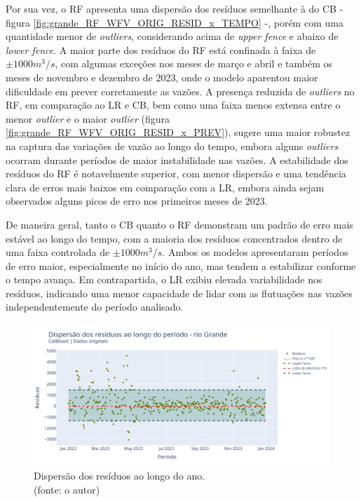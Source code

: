 Por sua vez, o RF apresenta uma dispersão dos resíduos semelhante à do CB - figura \ref{fig:grande_RF_WFV_ORIG_RESID_x_TEMPO} -, porém com uma quantidade menor de \textit{outliers}, considerando acima de \textit{upper fence} e abaixo de \textit{lower fence}. A maior parte dos resíduos do RF está confinada à faixa de $\pm 1000 m^3/s$, com algumas exceções nos meses de março e abril e também os meses de novembro e dezembro de 2023, onde o modelo aparentou maior dificuldade em prever corretamente as vazões. A presença reduzida de \textit{outliers} no RF, em comparação ao LR e CB, bem como uma faixa menos extensa entre o menor \textit{outlier} e o maior \textit{outlier} (figura \ref{fig:grande_RF_WFV_ORIG_RESID_x_PREV}), sugere uma maior robustez na captura das variações de vazão ao longo do tempo, embora alguns \textit{outliers} ocorram durante períodos de maior instabilidade nas vazões. A estabilidade dos resíduos do RF é notavelmente superior, com menor dispersão e uma tendência clara de erros mais baixos em comparação com a LR, embora ainda sejam observados alguns picos de erro nos primeiros meses de 2023.

De maneira geral, tanto o CB quanto o RF demonstram um padrão de erro mais estável ao longo do tempo, com a maioria dos resíduos concentrados dentro de uma faixa controlada de $\pm 1000 m^3/s$. Ambos os modelos apresentaram períodos de erro maior, especialmente no início do ano, mas tendem a estabilizar conforme o tempo avança. Em contrapartida, o LR exibiu elevada variabilidade nos resíduos, indicando uma menor capacidade de lidar com as flutuações nas vazões independentemente do período analisado.

\begin{figure}[!h]
	\centering
	\includegraphics[scale=0.33]{Figuras/rio_grande/wfv/CB/CB_WFV_ORIG_RESID_x_TEMPO.png}
	\caption{Dispersão dos resíduos ao longo do ano.\\(fonte: o autor)}
	\label{fig:grande_CB_WFV_ORIG_RESID_x_TEMPO}
\end{figure}

